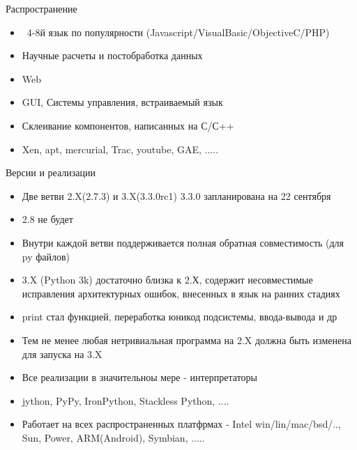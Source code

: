 \documentclass{article}
\begin{document}
\begin{center} Распространение \end{center}
\begin{itemize}
    \item ~4-8й язык по популярности (Javascript/VisualBasic/ObjectiveC/PHP)
    \item Научные расчеты и постобработка данных
    \item Web
    \item GUI, Системы управления, встраиваемый язык
    \item Склеивание компонентов, написанных на С/С++
    \item Xen, apt, mercurial, Trac, youtube, GAE, .....
\end{itemize}
\newpage

\begin{center} Версии и реализации \end{center}
\begin{itemize}
    \item Две ветви 2.X(2.7.3) и 3.X(3.3.0rc1) 3.3.0 запланирована на 22 сентября
    \item 2.8 не будет
    \item Внутри каждой ветви поддерживается полная обратная совместимость (для py файлов)
    \item 3.X (Python 3k) достаточно близка к 2.Х, содержит несовместимые исправления 
    		архитектурных ошибок, внесенных в язык на ранних стадиях
    \item print стал функцией, переработка юникод подсистемы, ввода-вывода и др
    \item Тем не менее любая нетривиальная программа на 2.X должна быть изменена для запуска на 3.X
    \item Все реализации в значительноы мере - интерпретаторы
    \item jython, PyPy, IronPython, Stackless Python, ....
    \item Работает на всех распространенных платфрмах - Intel win/lin/mac/bsd/.., Sun, Power, 
    		ARM(Android), Symbian, .....
\end{itemize}
\newpage
\end{document}
